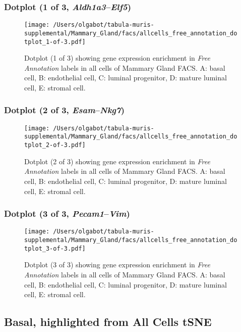 \subsubsection{Dotplot (1 of 3, \emph{Aldh1a3}--\emph{Elf5})}
\begin{figure}[h]
\centering
\texttt{[image: /Users/olgabot/tabula-muris-supplemental/Mammary\_Gland/facs/allcells\_free\_annotation\_dotplot\_1-of-3.pdf]}

\caption{ Dotplot (1 of 3)  showing gene expression enrichment in \emph{Free Annotation} labels in all cells of Mammary Gland FACS. A: basal cell, B: endothelial cell, C: luminal progenitor, D: mature luminal cell, E: stromal cell.}
\end{figure}


\clearpage

\subsubsection{Dotplot (2 of 3, \emph{Esam}--\emph{Nkg7})}
\begin{figure}[h]
\centering
\texttt{[image: /Users/olgabot/tabula-muris-supplemental/Mammary\_Gland/facs/allcells\_free\_annotation\_dotplot\_2-of-3.pdf]}

\caption{ Dotplot (2 of 3)  showing gene expression enrichment in \emph{Free Annotation} labels in all cells of Mammary Gland FACS. A: basal cell, B: endothelial cell, C: luminal progenitor, D: mature luminal cell, E: stromal cell.}
\end{figure}


\clearpage

\subsubsection{Dotplot (3 of 3, \emph{Pecam1}--\emph{Vim})}
\begin{figure}[h]
\centering
\texttt{[image: /Users/olgabot/tabula-muris-supplemental/Mammary\_Gland/facs/allcells\_free\_annotation\_dotplot\_3-of-3.pdf]}

\caption{ Dotplot (3 of 3)  showing gene expression enrichment in \emph{Free Annotation} labels in all cells of Mammary Gland FACS. A: basal cell, B: endothelial cell, C: luminal progenitor, D: mature luminal cell, E: stromal cell.}
\end{figure}


\clearpage
\subsection{Basal, highlighted from All Cells tSNE}
